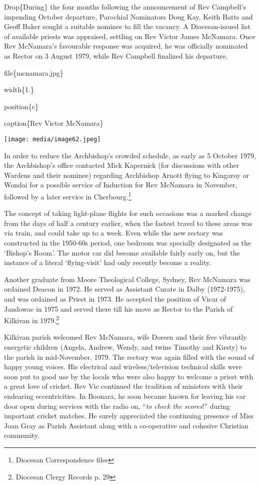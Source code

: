 Drop\{During\} the four months following the announcement of Rev Campbell's impending October departure, Parochial Nominators Doug Kay, Keith Batts and Geoff Baker sought a suitable nominee to fill the vacancy. A Diocesan-issued list of available priests was appraised, settling on Rev Victor James McNamara. Once Rev McNamara's favourable response was acquired, he was officially nominated as Rector on 3 August 1979, while Rev Campbell finalized his departure.

file\{mcnamara.jpg\}

width\{1.\}

position\{c\}

caption\{Rev Victor McNamara\}

\texttt{[image: media/image62.jpeg]}

In order to reduce the Archbishop's crowded schedule, as early as 5 October 1979, the Archbishop's office contacted Mick Kapernick (for discussions with other Wardens and their nominee) regarding Archbishop Arnott flying to Kingaroy or Wondai for a possible service of Induction for Rev McNamara in November, followed by a later service in Cherbourg.\footnote{Diocesan Correspondence files}

The concept of taking light-plane flights for such occasions was a marked change from the days of half a century earlier, when the fastest travel to these areas was via train, and could take up to a week. Even while the new rectory was constructed in the 1950-60s period, one bedroom was specially designated as the `Bishop's Room'. The motor car did become available fairly early on, but the instance of a literal `flying-visit' had only recently become a reality.

Another graduate from Moore Theological College, Sydney, Rev McNamara was ordained Deacon in 1972. He served as Assistant Curate in Dalby (1972-1975), and was ordained as Priest in 1973. He accepted the position of Vicar of Jandowae in 1975 and served there till his move as Rector to the Parish of Kilkivan in 1979.\footnote{Diocesan Clergy Records p. 29}

Kilkivan parish welcomed Rev McNamara, wife Doreen and their five vibrantly energetic children (Angela, Andrew, Wendy, and twins Timothy and Kirsty) to the parish in mid-November, 1979. The rectory was again filled with the sound of happy young voices. His electrical and wireless/television technical skills were soon put to good use by the locals who were also happy to welcome a priest with a great love of cricket. Rev Vic continued the tradition of ministers with their endearing eccentricities. In Boonara, he soon became known for leaving his car door open during services with the radio on, ``\emph{to check the scores}!'' during important cricket matches. He surely appreciated the continuing presence of Miss Joan Gray as Parish Assistant along with a co-operative and cohesive Christian community.

